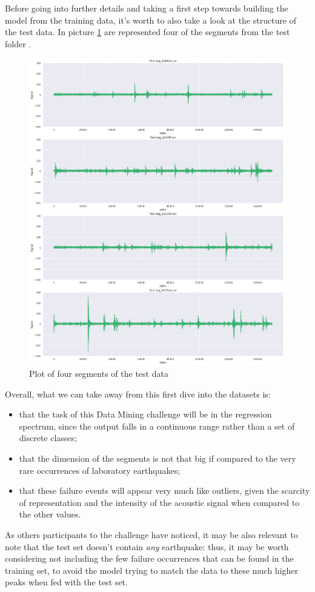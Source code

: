 Before going into further details and taking a first step towards building the model from the training data, it's worth to also take a look at the structure of the test data. In picture \ref{fig:plot3} are represented four of the segments from the test folder \cite{kernelallunia}.

\begin{figure} [h]
	\centering
	\includegraphics[width=0.7\linewidth]{pictures/plot3.png}
	\caption{Plot of four segments of the test data}
	\label{fig:plot3}
\end{figure}

\bigbreak

Overall, what we can take away from this first dive into the datasets is:
\begin{itemize}
	\item that the task of this Data Mining challenge will be in the regression spectrum, since the output falls in a continuous range rather than a set of discrete classes;
	\item that the dimension of the segments is not that big if compared to the very rare occurrences of laboratory earthquakes;
	\item that these failure events will appear very much like outliers, given the scarcity of representation and the intensity of the acoustic signal when compared to the other values.
\end{itemize}

As others participants to the challenge have noticed, it may be also relevant to note that the test set doesn't contain \textit{any} earthquake: thus, it may be worth considering not including the few failure occurrences that can be found in the training set, to avoid the model trying to match the data to these much higher peaks when fed with the test set.